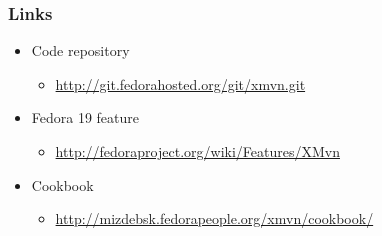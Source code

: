 \documentclass[pdftex,unicode,xcolor=table]{beamer}
\begin{document}
\begin{frame}
  \frametitle{Links}
  \begin{itemize}
    \item Code repository
    \begin{itemize}
    \item \url{http://git.fedorahosted.org/git/xmvn.git}
      \end{itemize}
    \item Fedora 19 feature
    \begin{itemize}
      \item \url{http://fedoraproject.org/wiki/Features/XMvn}
    \end{itemize}
    \item Cookbook
    \begin{itemize}
      \item \url{http://mizdebsk.fedorapeople.org/xmvn/cookbook/}
    \end{itemize}
  \end{itemize}
\end{frame}



 {
  \Rhbg{\frame{\theend}}
}
\end{document}
